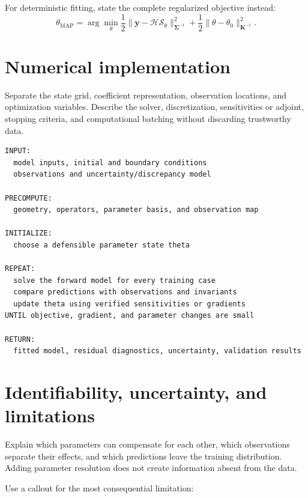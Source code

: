 \documentclass[11pt]{article}
\newcommand{\vect}[1]{\bm{#1}}
\begin{document}
For deterministic fitting, state the complete regularized objective instead:
\begin{equation}
 \theta_{\mathrm{MAP}}
 =\arg\min_\theta
 \frac12\|\vect y-\mathcal H\mathcal S_\theta\|_{\vect\Sigma^{-1}}^2
 +\frac12\|\theta-\theta_0\|_{\vect K^{-1}}^2 .
 \label{eq:map}
\end{equation}

\section{Numerical implementation}

Separate the state grid, coefficient representation, observation locations, and optimization variables. Describe the solver, discretization, sensitivities or adjoint, stopping criteria, and computational batching without discarding trustworthy data.

\begin{lstlisting}[style=pseudocode,caption={Generic verified calibration workflow.},label={alg:workflow}]
INPUT:
  model inputs, initial and boundary conditions
  observations and uncertainty/discrepancy model

PRECOMPUTE:
  geometry, operators, parameter basis, and observation map

INITIALIZE:
  choose a defensible parameter state theta

REPEAT:
  solve the forward model for every training case
  compare predictions with observations and invariants
  update theta using verified sensitivities or gradients
UNTIL objective, gradient, and parameter changes are small

RETURN:
  fitted model, residual diagnostics, uncertainty, validation results
\end{lstlisting}

\section{Identifiability, uncertainty, and limitations}

Explain which parameters can compensate for each other, which observations separate their effects, and which predictions leave the training distribution. Adding parameter resolution does not create information absent from the data.

Use a callout for the most consequential limitation:
\begin{center}
\end{center}
\end{document}
